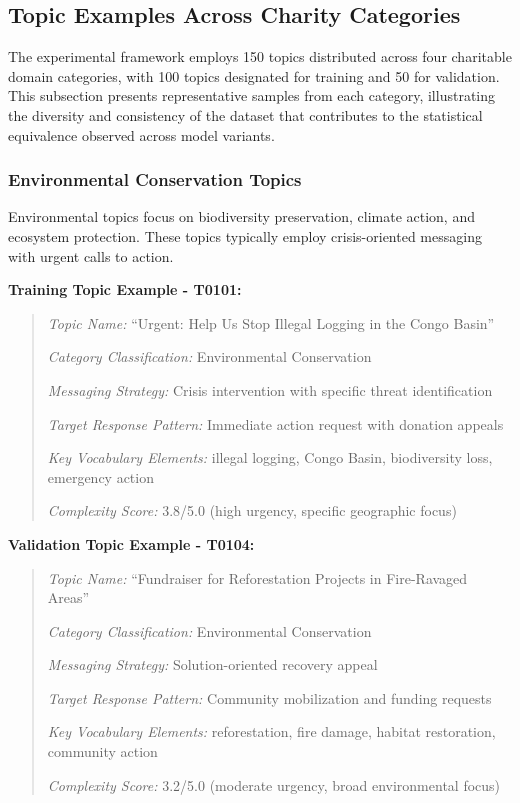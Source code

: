 \subsection{Topic Examples Across Charity Categories}
\label{subsec:topic-examples-categories}

The experimental framework employs 150 topics distributed across four charitable domain categories, with 100 topics designated for training and 50 for validation. This subsection presents representative samples from each category, illustrating the diversity and consistency of the dataset that contributes to the statistical equivalence observed across model variants.

\subsubsection{Environmental Conservation Topics}

Environmental topics focus on biodiversity preservation, climate action, and ecosystem protection. These topics typically employ crisis-oriented messaging with urgent calls to action.

\textbf{Training Topic Example - T0101:}
\begin{quote}
\textit{Topic Name:} ``Urgent: Help Us Stop Illegal Logging in the Congo Basin''

\textit{Category Classification:} Environmental Conservation

\textit{Messaging Strategy:} Crisis intervention with specific threat identification

\textit{Target Response Pattern:} Immediate action request with donation appeals

\textit{Key Vocabulary Elements:} illegal logging, Congo Basin, biodiversity loss, emergency action

\textit{Complexity Score:} 3.8/5.0 (high urgency, specific geographic focus)
\end{quote}

\textbf{Validation Topic Example - T0104:}
\begin{quote}
\textit{Topic Name:} ``Fundraiser for Reforestation Projects in Fire-Ravaged Areas''

\textit{Category Classification:} Environmental Conservation

\textit{Messaging Strategy:} Solution-oriented recovery appeal

\textit{Target Response Pattern:} Community mobilization and funding requests

\textit{Key Vocabulary Elements:} reforestation, fire damage, habitat restoration, community action

\textit{Complexity Score:} 3.2/5.0 (moderate urgency, broad environmental focus)
\end{quote}


